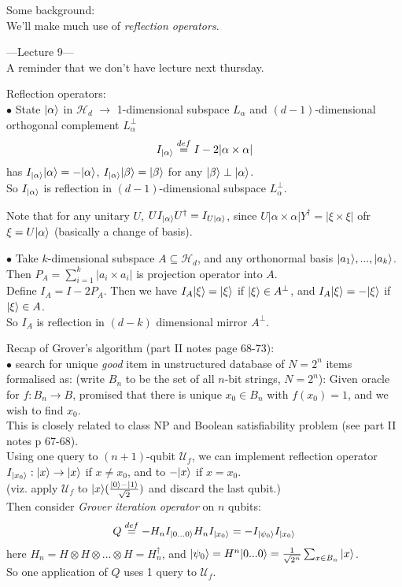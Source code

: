 \documentclass[a4paper]{article}
\begin{document}
Some background:\\
We'll make much use of \emph{reflection operators}.

---Lecture 9---\\
A reminder that we don't have lecture next thursday.

Reflection operators:\\
$\bullet$ State $|\alpha\rangle$ in $\mathcal{H}_d$ $\to$ 1-dimensional subspace $L_\alpha$ and $(d-1)$-dimensional orthogonal complement $L_\alpha^\perp$
$$I_{|\alpha\rangle} \stackrel{def}{=} I-2|\alpha \times \alpha|$$
has $I_{|\alpha\rangle} |\alpha\rangle = -|\alpha\rangle$, $I_{|\alpha\rangle} |\beta\rangle = |\beta\rangle$ for any $|\beta \rangle \perp |\alpha\rangle$.\\
So $I_{|\alpha\rangle}$ is reflection in $(d-1)$-dimensional subspace $L_{\alpha}^\perp$.

Note that for any unitary $U$, $U I_{|\alpha\rangle} U^\dagger = I_{U|\alpha\rangle}$, since $U|\alpha \times \alpha|Y^\dagger = |\xi \times \xi|$ ofr $\xi = U|\alpha\rangle$ (basically a change of basis).

$\bullet$ Take $k$-dimensional subspace $A \subseteq \mathcal{H}_d$, and any orthonormal basis $|a_1\rangle,...,|a_k\rangle$. Then $P_A = \sum_{i=1}^k |a_i \times a_i|$ is projection operator into $A$.\\
Define $I_A = I-2P_A$. Then we have $I_A |\xi\rangle = |\xi\rangle$ if $|\xi\rangle \in A^\perp$, and $I_A|\xi\rangle = -|\xi\rangle$ if $|\xi\rangle \in A$.\\
So $I_A$ is reflection in $(d-k)$ dimensional mirror $A^\perp$.

Recap of Grover's algorithm (part II notes page 68-73):\\
$\bullet$ search for unique \emph{good} item in unstructured database of $N=2^n$ items formalised as: (write $B_n$ to be the set of all $n$-bit strings, $N=2^n$):
Given oracle for $f:B_n \to B$, promised that there is unique $x_0 \in B_n$ with $f(x_0) = 1$, and we wish to find $x_0$.\\
This is closely related to class NP and Boolean satisfiability problem (see part II notes p 67-68).\\
Using one query to $(n+1)$-qubit $\mathcal{U}_f$, we can implement reflection operator $I_{|x_0\rangle} : |x\rangle \to |x\rangle$ if $x \neq x_0$, and to $-|x\rangle$ if $x=x_0$.\\
(viz. apply $\mathcal{U}_f$ to $|x\rangle (\frac{|0\rangle - |1\rangle}{\sqrt{2}})$ and discard the last qubit.)\\
Then consider \emph{Grover iteration operator} on $n$ qubits:\\
$$Q \stackrel{def}{=} -H_n I_{|0...0\rangle} H_n I_{|x_0\rangle} = -I_{|\psi_0\rangle} I_{|x_0\rangle}$$
here $H_n = H\otimes H \otimes ... \otimes H = H_n^{\dagger}$, and $|\psi_0\rangle = H^n |0...0\rangle = \frac{1}{\sqrt{2^n}} \sum_{x \in B_n} |x\rangle$.\\
So one application of $Q$ uses 1 query to $\mathcal{U}_f$.
\end{document}
